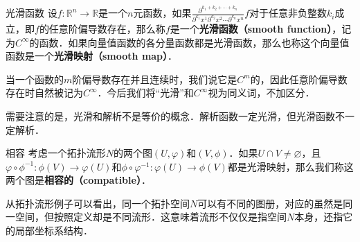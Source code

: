 \begin{definition}{光滑函数}
设$f:\mathbb{R}^n\rightarrow\mathbb{R}$是一个$n$元函数，如果$\frac{\partial^{k_1+k_2+\cdots+k_n}}{\partial^{k_1}x^1\partial^{k_2}x^2\cdots\partial^{k_n}x^n} f$对于任意非负整数$k_i$成立，即$f$的任意阶偏导数存在，那么称$f$是一个\textbf{光滑函数（smooth function）}，记为$C^\infty$的函数．如果向量值函数的各分量函数都是光滑函数，那么也称这个向量值函数是一个\textbf{光滑映射（smooth map）}．
\end{definition}

当一个函数的$m$阶偏导数存在并且连续时，我们说它是$C^m$的，因此任意阶偏导数存在时自然被记为$C^\infty$．今后我们将“光滑”和$C^\infty$视为同义词，不加区分．

需要注意的是，光滑和解析不是等价的概念．解析函数一定光滑，但光滑函数不一定解析．

\begin{definition}{相容}
考虑一个拓扑流形$N$的两个图$(U, \varphi)$和$(V, \phi)$．如果$U\cap V\not=\varnothing$，且$\varphi\circ\phi^{-1}:\phi(V)\rightarrow\varphi(U)$和$\phi\circ\varphi^{-1}:\varphi(U)\rightarrow\phi(V)$都是光滑映射，那么我们称这两个图是\textbf{相容的（compatible）}．
\end{definition}

从拓扑流形例子可以看出，同一个拓扑空间$N$可以有不同的图册，对应的虽然是同一空间，但按照定义却是不同流形．这意味着流形不仅仅是指空间$N$本身，还指它的局部坐标系结构．





